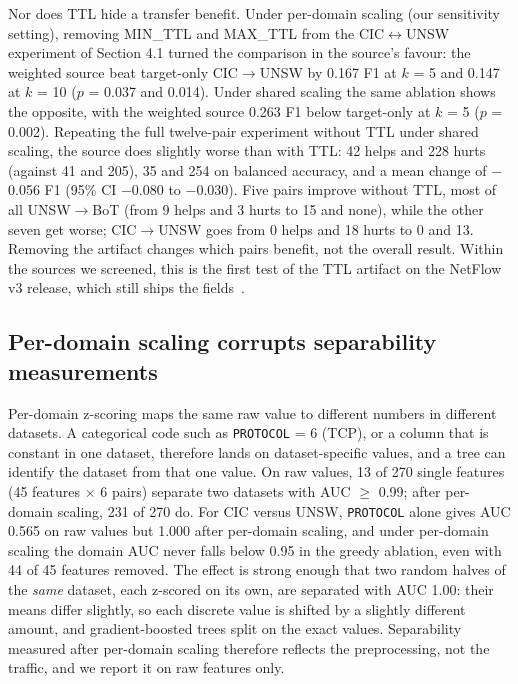 \documentclass[11pt]{article}
\begin{document}
Nor does TTL hide a transfer benefit. Under per-domain scaling (our sensitivity setting), removing MIN\_TTL and MAX\_TTL from the CIC$\leftrightarrow$UNSW experiment of Section 4.1 turned the comparison in the source's favour: the weighted source beat target-only CIC$\to$UNSW by 0.167 F1 at $k$ = 5 and 0.147 at $k$ = 10 ($p$ = 0.037 and 0.014). Under shared scaling the same ablation shows the opposite, with the weighted source 0.263 F1 below target-only at $k$ = 5 ($p$ = 0.002). Repeating the full twelve-pair experiment without TTL under shared scaling, the source does slightly worse than with TTL: 42 helps and 228 hurts (against 41 and 205), 35 and 254 on balanced accuracy, and a mean change of $-$0.056 F1 (95\% CI $-$0.080 to $-$0.030). Five pairs improve without TTL, most of all UNSW$\to$BoT (from 9 helps and 3 hurts to 15 and none), while the other seven get worse; CIC$\to$UNSW goes from 0 helps and 18 hurts to 0 and 13. Removing the artifact changes which pairs benefit, not the overall result. Within the sources we screened, this is the first test of the TTL artifact on the NetFlow v3 release, which still ships the fields~\cite{luay2025temporal}.

\subsection{Per-domain scaling corrupts separability measurements}

Per-domain z-scoring maps the same raw value to different numbers in different datasets. A categorical code such as \texttt{PROTOCOL} = 6 (TCP), or a column that is constant in one dataset, therefore lands on dataset-specific values, and a tree can identify the dataset from that one value. On raw values, 13 of 270 single features (45 features $\times$ 6 pairs) separate two datasets with AUC $\geq$ 0.99; after per-domain scaling, 231 of 270 do. For CIC versus UNSW, \texttt{PROTOCOL} alone gives AUC 0.565 on raw values but 1.000 after per-domain scaling, and under per-domain scaling the domain AUC never falls below 0.95 in the greedy ablation, even with 44 of 45 features removed. The effect is strong enough that two random halves of the \emph{same} dataset, each z-scored on its own, are separated with AUC 1.00: their means differ slightly, so each discrete value is shifted by a slightly different amount, and gradient-boosted trees split on the exact values. Separability measured after per-domain scaling therefore reflects the preprocessing, not the traffic, and we report it on raw features only.
\end{document}
